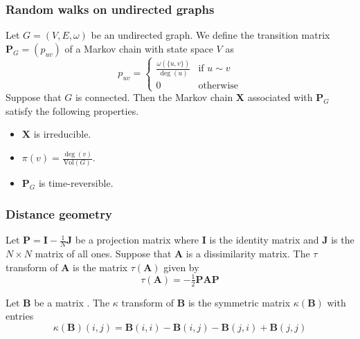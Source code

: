 \documentclass[professionalfonts, hyperref={pdfpagelabels=false,
  colorlinks=true, linkcolor=purple}]{beamer}
\begin{document}
\begin{frame}[label=random-walks]
  \frametitle{Random walks on undirected graphs}
    Let $G = (V,E,\omega)$ be an undirected graph. We define the transition matrix
    $\bm{P}_G = (p_{uv})$ of a Markov chain with state space $V$ as
    \begin{equation}
      \label{eq:2}
      p_{uv} = \begin{cases}
        \tfrac{\omega(\{u,v\})}{\deg(u)} & \text{if $u \sim v$} \\
        0 & \text{otherwise}
      \end{cases}
    \end{equation}
    Suppose that $G$ is connected. Then the Markov chain $\mathbf{X}$ associated with
    $\bm{P}_G$ satisfy the following properties.
    \begin{itemize}
    \item $\mathbf{X}$ is \alert{irreducible}.
    \item $\pi(v) = \tfrac{\deg(v)}{\mathrm{Vol}(G)}$.
    \item $\bm{P}_G$ is \alert{time-reversible}.
    \end{itemize}
  
\end{frame}

\begin{frame}[label=distance_geometry]
  \frametitle{Distance geometry}
    \begin{definition}
      \label{def:1}
      Let $\bm{P} = \bm{I} - \tfrac{1}{N}\bm{J}$ be a projection matrix
      where $\bm{I}$ is the identity matrix and $\bm{J}$ is the $N
      \times N$ matrix of all ones. Suppose that $\bm{A}$ is a
      dissimilarity matrix. The \alert{$\tau$ transform} of $\bm{A}$ is
      the matrix $\tau(\bm{A})$ given by
      \begin{equation}
        \label{eq:1}
        \tau(\bm{A}) = -\tfrac{1}{2} \bm{P} \bm{A} \bm{P}
      \end{equation}
    \end{definition}
    \begin{definition}
      Let $\bm{B}$ be a matrix . The
      $\kappa$ transform of $\bm{B}$ is the symmetric matrix
      $\kappa(\bm{B})$ with entries
      \begin{equation}
        \label{eq:34}
        \kappa(\bm{B})(i,j) = \bm{B}(i,i) - \bm{B}(i,j) - \bm{B}(j,i) +
        \bm{B}(j,j)
      \end{equation}
    \end{definition}
\end{frame}
\end{document}
